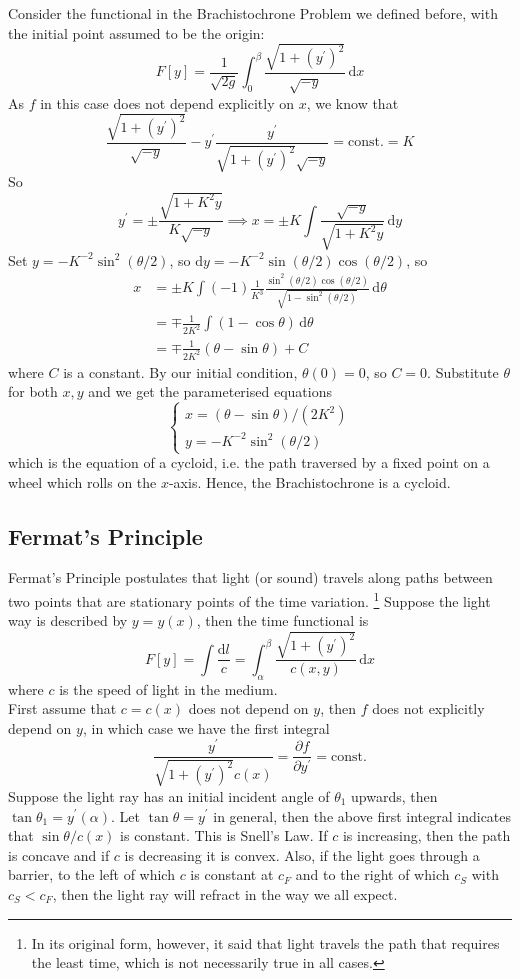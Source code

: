 \begin{example}
    Consider the functional in the Brachistochrone Problem we defined before, with the initial point assumed to be the origin:
    $$F[y]=\frac{1}{\sqrt{2g}}\int_0^\beta\frac{\sqrt{1+(y^\prime)^2}}{\sqrt{-y}}\,\mathrm dx$$
    As $f$ in this case does not depend explicitly on $x$, we know that
    $$\frac{\sqrt{1+(y^\prime)^2}}{\sqrt{-y}}-y^\prime\frac{y^\prime}{\sqrt{1+(y^\prime)^2}\sqrt{-y}}=\text{const.}=K$$
    So
    $$y^\prime=\pm\frac{\sqrt{1+K^2y}}{K\sqrt{-y}}\implies x=\pm K\int\frac{\sqrt{-y}}{\sqrt{1+K^2y}}\,\mathrm dy$$
    Set $y=-K^{-2}\sin^2(\theta/2)$, so $\mathrm dy=-K^{-2}\sin(\theta/2)\cos(\theta/2)$, so
    \begin{align*}
        x&=\pm K\int(-1)\frac{1}{K^3}\frac{\sin^2(\theta/2)\cos(\theta/2)}{\sqrt{1-\sin^2(\theta/2)}}\,\mathrm d\theta\\
        &=\mp\frac{1}{2K^2}\int(1-\cos\theta)\,\mathrm d\theta\\
        &=\mp\frac{1}{2K^2}(\theta-\sin\theta)+C
    \end{align*}
    where $C$ is a constant.
    By our initial condition, $\theta(0)=0$, so $C=0$.
    Substitute $\theta$ for both $x,y$ and we get the parameterised equations
    $$\begin{cases}
        x=(\theta-\sin\theta)/(2K^2)\\
        y=-K^{-2}\sin^2(\theta/2)
    \end{cases}$$
    which is the equation of a cycloid, i.e. the path traversed by a fixed point on a wheel which rolls on the $x$-axis.
    Hence, the Brachistochrone is a cycloid.
\end{example}
\subsection{Fermat's Principle}
Fermat's Principle postulates that light (or sound) travels along paths between two points that are stationary points of the time variation.
\footnote{In its original form, however, it said that light travels the path that requires the least time, which is not necessarily true in all cases.}
Suppose the light way is described by $y=y(x)$, then the time functional is
$$F[y]=\int\frac{\mathrm dl}{c}=\int_\alpha^\beta\frac{\sqrt{1+(y^\prime)^2}}{c(x,y)}\,\mathrm dx$$
where $c$ is the speed of light in the medium.\\
First assume that $c=c(x)$ does not depend on $y$, then $f$ does not explicitly depend on $y$, in which case we have the first integral
$$\frac{y^\prime}{\sqrt{1+(y^\prime)^2}c(x)}=\frac{\partial f}{\partial y^\prime}=\text{const.}$$
Suppose the light ray has an initial incident angle of $\theta_1$ upwards, then $\tan\theta_1=y^\prime(\alpha)$.
Let $\tan\theta=y^\prime$ in general, then the above first integral indicates that $\sin\theta/c(x)$ is constant.
This is Snell's Law.
If $c$ is increasing, then the path is concave and if $c$ is decreasing it is convex.
Also, if the light goes through a barrier, to the left of which $c$ is constant at $c_F$ and to the right of which $c_S$ with $c_S<c_F$, then the light ray will refract in the way we all expect.